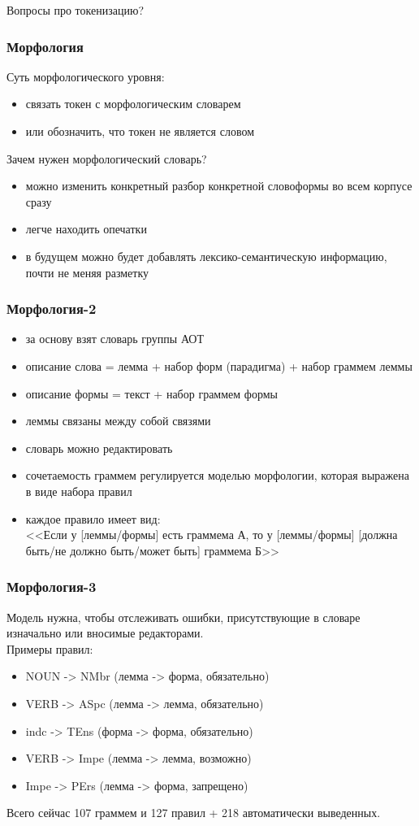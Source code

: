 \documentclass{beamer}
\begin{document}
\begin{frame}
Вопросы про токенизацию?
\end{frame}

\begin{frame}
\frametitle{Морфология}
Суть морфологического уровня:
\begin{itemize}
\item{связать токен с морфологическим словарем}
\item{или обозначить, что токен не является словом}
\end{itemize}
\pause
Зачем нужен морфологический словарь?
\begin{itemize}
\item{можно изменить конкретный разбор конкретной словоформы во всем корпусе сразу}
\item{легче находить опечатки}
\item{в будущем можно будет добавлять лексико-семантическую информацию, почти не меняя разметку}
\end{itemize}
\end{frame}

\begin{frame}
\frametitle{Морфология-2}
\begin{itemize}
\item{за основу взят словарь группы АОТ}
\pause
\item{описание слова = лемма + набор форм (парадигма) + набор граммем леммы}
\pause
\item{описание формы = текст + набор граммем формы}
\pause
\item{леммы связаны между собой связями}
\pause
\item{словарь можно редактировать}
\pause
\item{сочетаемость граммем регулируется моделью морфологии, которая выражена в виде набора правил}
\pause
\item{каждое правило имеет вид: \\
<<Если у [леммы/формы] есть граммема А, то у [леммы/формы] [должна быть/не должно быть/может быть] граммема Б>>}
\end{itemize}
\end{frame}

\begin{frame}
\frametitle{Морфология-3}
Модель нужна, чтобы отслеживать ошибки, присутствующие в словаре изначально или вносимые редакторами. \\
Примеры правил:
\begin{itemize}
\item{NOUN -> NMbr (лемма -> форма, обязательно)}
\item{VERB -> ASpc (лемма -> лемма, обязательно)}
\item{indc -> TEns (форма -> форма, обязательно)}
\item{VERB -> Impe (лемма -> лемма, возможно)}
\item{Impe -> PErs (лемма -> форма, запрещено)}
\end{itemize}
Всего сейчас 107 граммем и 127 правил + 218 автоматически выведенных.
\end{frame}
\end{document}
